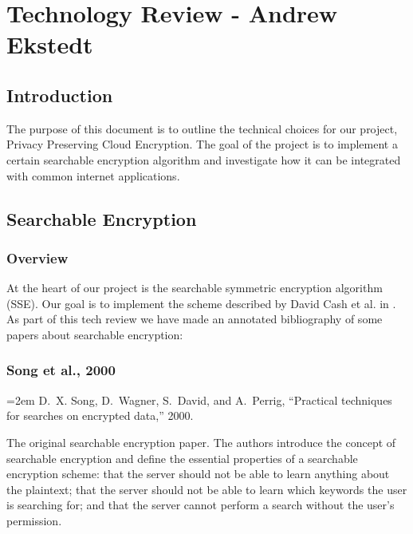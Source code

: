 
\chapter{Technology Review - Andrew Ekstedt}

\section{ Introduction }

The purpose of this document is to outline the technical choices for our project, Privacy Preserving Cloud Encryption. The goal of the project is to implement a certain searchable encryption algorithm and investigate how it can be integrated with common internet applications.


\section{ Searchable Encryption }

\subsection{ Overview }

At the heart of our project is the searchable symmetric encryption algorithm (SSE).
Our goal is to implement the scheme described by David Cash et al. in \cite{cash14}. As part of this tech review we have made an annotated bibliography of some papers about searchable encryption:


\subsection{Song et al., 2000}

\begin{flushleft}
\footnotesize
\hangindent=2em
\cite{song00} %
D.~X. Song, D.~Wagner, S.~David, and A.~Perrig, ``Practical techniques for
  searches on encrypted data,'' 2000.
\end{flushleft}

The original searchable encryption paper.
The authors introduce the concept of searchable encryption and define the essential properties of a searchable encryption scheme:
that the server should not be able to learn anything about the plaintext;
that the server should not be able to learn which keywords the user is searching for;
and that the server cannot perform a search without the user's permission.

